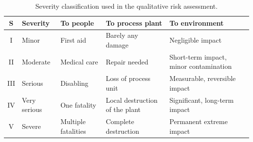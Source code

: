 \begin{table}[ht]
  \centering
  \caption{Severity classification used in the qualitative risk assessment.}
  \label{tab:severity}
  \begin{tabularx}{\textwidth}{|c|X|X|X|X|}
    \hline
    \textbf{S} & \textbf{Severity} & \textbf{To people}  & \textbf{To process plant}      & \textbf{To environment}                \\
    \hline
    I          & Minor             & First aid           & Barely any damage              & Negligible impact                      \\
    \hline
    II         & Moderate          & Medical care        & Repair needed                  & Short-term impact, minor contamination \\
    \hline
    III        & Serious           & Disabling           & Loss of process unit           & Measurable, reversible impact          \\
    \hline
    IV         & Very serious      & One fatality        & Local destruction of the plant & Significant, long-term impact          \\
    \hline
    V          & Severe            & Multiple fatalities & Complete destruction           & Permanent extreme impact               \\
    \hline
  \end{tabularx}
\end{table}

\vspace{2em}

